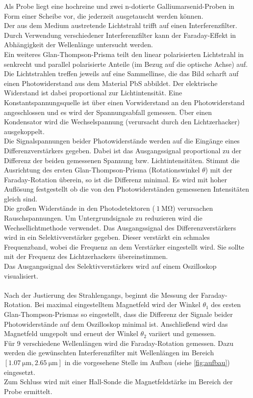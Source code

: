 Als Probe liegt eine hochreine und zwei n-dotierte Galliumarsenid-Proben in Form einer Scheibe vor, die jederzeit ausgetauscht werden können.
\\
Der aus dem Medium austretende Lichtstrahl trifft auf einen Interferenzfilter.
Durch Verwendung verschiedener Interferenzfilter kann der Faraday-Effekt in Abhängigkeit der Wellenlänge untersucht werden.
\\
Ein weiteres Glan-Thompson-Prisma teilt den linear polarisierten Lichtstrahl in senkrecht und parallel polarisierte Anteile (im Bezug auf die optische Achse) auf.
Die Lichtstrahlen treffen jeweils auf eine Sammellinse, die das Bild scharft auf einen Photowiderstand aus dem Material PbS abbildet.
Der elektrische Widerstand ist dabei proportional zur Lichtintensität.
Eine Konstantspannungsquelle ist über einen Vorwiderstand an den Photowiderstand angeschlossen und es wird der Spannungsabfall gemessen.
Über einen Kondensator wird die Wechselspannung (verursacht durch den Lichtzerhacker) ausgekoppelt.
\\
Die Signalspannungen beider Photowiderstände werden auf die Eingänge eines Differenzverstärkers gegeben.
Dabei ist das Ausgangssignal proportional zu der Differenz der beiden gemessenen Spannung bzw. Lichtintensitäten.
Stimmt die Ausrichtung des ersten Glan-Thompson-Prisma (Rotationswinkel $\theta$) mit der Faraday-Rotation überein, so ist die Differenz minimal.
Es wird mit hoher Auflösung festgestellt ob die von den Photowiderständen gemessenen Intensitäten gleich sind.
\\
Die großen Widerstände in den Photodetektoren ($~ \qty{1}{\mega\ohm}$) verursachen Rauschspannungen.
Um Untergrundsignale zu reduzieren wird die Wechsellichtmethode verwendet.
Das Ausgangssignal des Differenzverstärkers wird in ein Selektivverstärker gegeben.
Dieser verstärkt ein schmales Frequenzband, wobei die Frequenz an dem Verstärker eingestellt wird.
Sie sollte mit der Frequenz des Lichtzerhackers übereinstimmen.
\\
Das Ausgangssignal des Selektivverstärkers wird auf einem Oszilloskop visualisiert.
\\
\\
Nach der Justierung des Strahlengangs, beginnt die Messung der Faraday-Rotation.
Bei maximal eingestelltem Magnetfeld wird der Winkel $\theta_1$ des ersten Glan-Thompson-Prismas so eingestellt, dass die Differenz der Signale beider Photowiderstände auf dem Oszilloskop minimal ist.
Anschließend wird das Magnetfeld umgepolt und erneut der Winkel $\theta_2$ variiert und gemessen.
\\
Für 9 verschiedene Wellenlängen wird die Faraday-Rotation gemessen.
Dazu werden die gewünschten Interferenzfilter mit Wellenlängen im Bereich $[\qty{1.07}{\micro\metre}, \qty{2.65}{\micro\metre}]$ in die vorgesehene Stelle im Aufbau (siehe \autoref{fig:aufbau}) eingesetzt.
\\
Zum Schluss wird mit einer Hall-Sonde die Magnetfeldstärke im Bereich der Probe ermittelt.